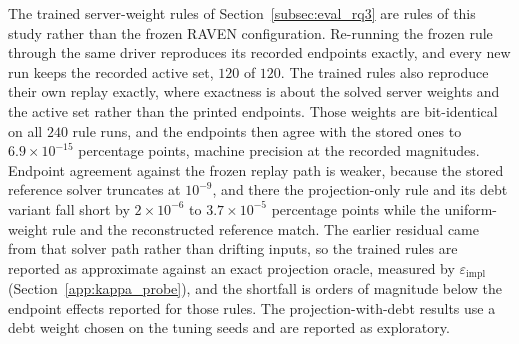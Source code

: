 \documentclass[letterpaper,journal]{IEEEtran}
\begin{document}
The trained server-weight rules of Section~\ref{subsec:eval_rq3} are rules of
this study rather than the frozen RAVEN configuration.  Re-running the frozen
rule through the same driver reproduces its recorded endpoints exactly, and every
new run keeps the recorded active set, $120$ of $120$.  The trained rules also
reproduce their own replay exactly, where exactness is about the solved server
weights and the active set rather than the printed endpoints.  Those weights are
bit-identical on all $240$ rule runs, and the endpoints then agree with the
stored ones to $6.9\times10^{-15}$ percentage points, machine precision at the
recorded magnitudes.  Endpoint agreement against
the frozen replay path is weaker, because the stored reference
solver truncates at $10^{-9}$, and there the projection-only rule and its debt
variant fall short by $2\times10^{-6}$ to $3.7\times10^{-5}$ percentage points
while the uniform-weight rule and the reconstructed reference match.  The earlier
residual came from that solver path rather than drifting inputs, so the trained
rules are reported as approximate against an exact projection oracle, measured
by $\varepsilon_{\mathrm{impl}}$ (Section~\ref{app:kappa_probe}), and the
shortfall is orders of magnitude below the endpoint effects reported for those
rules.  The projection-with-debt results
use a debt weight chosen on the tuning seeds and are reported as exploratory.



\end{document}
